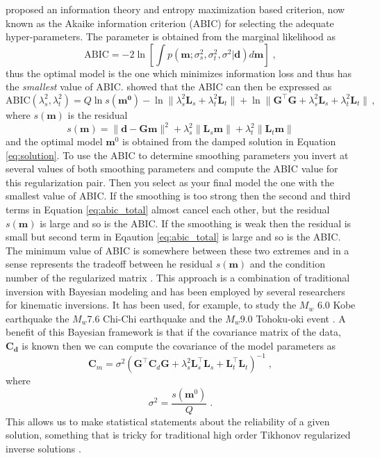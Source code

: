 \citet{akaike1980} proposed an information theory and entropy maximization based criterion, now known as the Akaike information criterion (ABIC) for selecting the adequate hyper-parameters. The parameter is obtained from the marginal likelihood as
\begin{equation}
\label{eq:abic}
\mathrm{ABIC}=-2\ln\left[\int p(\mathbf{m};\sigma_s^2,\sigma_t^2,\sigma^2|\mathbf{d})d\mathbf{m}\right]\;,
\end{equation}
thus the optimal model is the one which minimizes information loss and thus has the \textit{smallest} value of ABIC. \citet{fukahata2004} showed that the ABIC can then be expressed as
\begin{equation}
\label{eq:abic_total}
\mathrm{ABIC}(\lambda_s^2,\lambda^2_t)=Q\ln s(\mathbf{m^0})-\ln\|\lambda^2_s\mathbf{L}_s+\lambda_t^2\mathbf{L}_t\|+\ln\|\mathbf{G}^\top\mathbf{G}+\lambda_s^2\mathbf{L}_s+\lambda_t^2\mathbf{L}_t\|\,,
\end{equation}
where $s(\mathbf{m})$ is the residual
\begin{equation}
s(\mathbf{m})=\|\mathbf{d}-\mathbf{Gm}\|^2+\lambda_s^2\|\mathbf{L}_s\mathbf{m}\|+\lambda_t^2\|\mathbf{L}_t\mathbf{m}\|
\end{equation}
and the optimal model $\mathbf{m}^0$ is obtained from the damped solution in Equation \ref{eq:solution}. To use the ABIC to determine smoothing parameters you invert at several values of both smoothing parameters and compute the ABIC value for this regularization pair. Then you select as your final model the one with the smallest value of ABIC. If the smoothing is too strong then the second and third terms in Equation \ref{eq:abic_total} almost cancel each other, but the residual $s(\mathbf{m})$ is large and so is the ABIC. If the smoothing is weak then the residual is small but second term in Eqaution \ref{eq:abic_total} is large and so is the ABIC. The minimum value of ABIC is somewhere between these two extremes and in a sense represents the tradeoff between he residual $s(\mathbf{m})$ and the condition number of the regularized matrix \citep{ide2007}. This approach is a combination of traditional inversion with Bayesian modeling and has been employed by several researchers for kinematic inversions. It has been used, for example, to study the $M_w$ 6.0 Kobe earthquake \citep{sekiguchi2000} the $M_w$7.6 Chi-Chi earthquake \citep{wu2001} and the $M_w$9.0 Tohoku-oki event \citep{yoshida2011}.
A benefit of this Bayesian framework is that if the covariance matrix of the data, $\mathbf{C_d}$ is known then we can compute the covariance of the model parameters as \citep{yabuki1992,ide2007}
\begin{equation}
\mathbf{C}_m=\sigma^2(\mathbf{G}^\top\mathbf{C}_d\mathbf{G}+\lambda_s^2\mathbf{L}_s^\top\mathbf{L}_s+\mathbf{L}_t^\top\mathbf{L}_t)^{-1}\;,
\end{equation}
where
\begin{equation}
\sigma^2=\frac{s(\mathbf{m}^0)}{Q}\;.
\end{equation}
This allows us to make statistical statements about the reliability of a given solution, something that is tricky for traditional high order Tikhonov regularized inverse solutions \citep{aster2013}.


